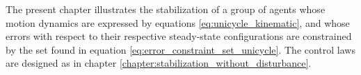 The present chapter illustrates the stabilization of a group of agents whose
motion dynamics are expressed by equations \eqref{eq:unicycle_kinematic}, and
whose errors with respect to their respective steady-state configurations are
constrained by the set found in equation \eqref{eq:error_constraint_set_unicycle}.
The control laws are designed as in chapter
\ref{chapter:stabilization_without_disturbance}.

